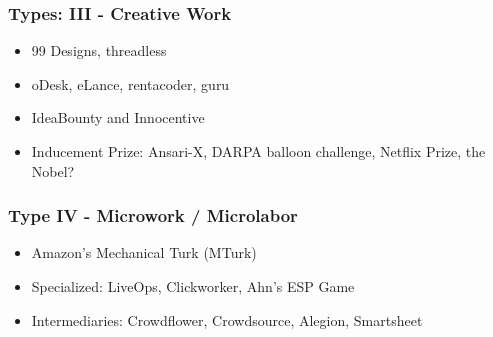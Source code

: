 \documentclass[slides]{beamer} %
\begin{document}
\begin{frame}\frametitle{Types: III - Creative Work}

\pause

\begin{itemize}

\vspace{-0.2cm}
\item 99 Designs, threadless

\vspace{-0.3cm}
 \pause
\vspace{-0.1cm}

\item oDesk, eLance, rentacoder, guru

\vspace{-0.1cm}
 \pause
\vspace{-0.1cm}

\item IdeaBounty and Innocentive

\vspace{-0.2cm}
 \pause
\vspace{-0.1cm}

\item Inducement Prize: Ansari-X, DARPA balloon challenge, Netflix Prize, the Nobel?

\vspace{-0.3cm}

\end{itemize}

\end{frame}

\begin{frame}\frametitle{Type IV - Microwork / Microlabor}

\pause

\begin{itemize}

\item Amazon's Mechanical Turk (MTurk)

 \pause

\item Specialized: LiveOps, Clickworker, Ahn's ESP Game

 \pause

\item Intermediaries: Crowdflower, Crowdsource, Alegion, Smartsheet


\end{itemize}

\end{frame}
\end{document}
